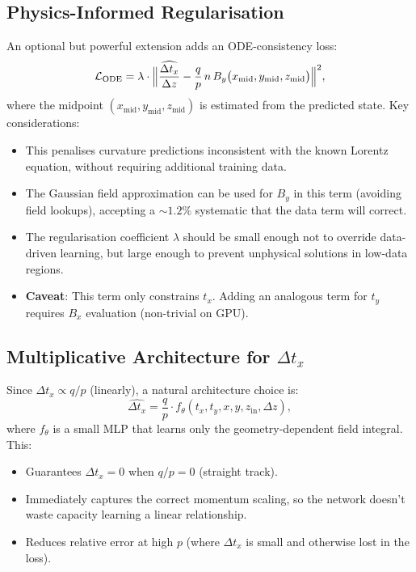 \documentclass[11pt,a4paper]{article}
\begin{document}
\subsection{Physics-Informed Regularisation}

An optional but powerful extension adds an ODE-consistency loss:
\begin{equation}
\mathcal{L}_{\mathrm{ODE}} =
  \lambda \cdot \Bigl\|
    \frac{\widehat{\Delta t_x}}{\Delta z}
    - \frac{q}{p}\,n\,B_y\bigl(x_{\mathrm{mid}}, y_{\mathrm{mid}}, z_{\mathrm{mid}}\bigr)
  \Bigr\|^2 ,
\label{eq:ode_loss}
\end{equation}
where the midpoint $(x_{\mathrm{mid}}, y_{\mathrm{mid}}, z_{\mathrm{mid}})$
is estimated from the predicted state.  Key considerations:
\begin{itemize}[leftmargin=*]
  \item This penalises curvature predictions inconsistent with the
        known Lorentz equation, without requiring additional training data.
  \item The Gaussian field approximation can be used for $B_y$ in this
        term (avoiding field lookups), accepting a $\sim 1.2\%$ systematic
        that the data term will correct.
  \item The regularisation coefficient $\lambda$ should be small enough
        not to override data-driven learning, but large enough to prevent
        unphysical solutions in low-data regions.
  \item \textbf{Caveat}: This term only constrains $t_x$.  Adding an
        analogous term for $t_y$ requires $B_x$ evaluation (non-trivial
        on GPU).
\end{itemize}

\subsection{Multiplicative Architecture for $\Delta t_x$}

Since $\Delta t_x \propto q/p$ (linearly), a natural architecture choice is:
\begin{equation}
\widehat{\Delta t_x} = \frac{q}{p} \cdot f_\theta(t_x, t_y, x, y, z_{\mathrm{in}}, \Delta z) ,
\end{equation}
where $f_\theta$ is a small MLP that learns only the geometry-dependent
field integral.  This:
\begin{itemize}[leftmargin=*]
  \item Guarantees $\Delta t_x = 0$ when $q/p = 0$ (straight track).
  \item Immediately captures the correct momentum scaling, so the
        network doesn't waste capacity learning a linear relationship.
  \item Reduces relative error at high $p$ (where $\Delta t_x$ is small
        and otherwise lost in the loss).
\end{itemize}
\end{document}
